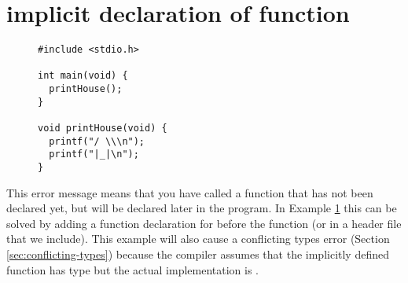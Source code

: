 \section{implicit declaration of function}\label{sec:implicit-def}

\begin{figure}
\begin{lstlisting}
#include <stdio.h>

int main(void) {
  printHouse();
}

void printHouse(void) {
  printf("/ \\\n");
  printf("|_|\n");
}
\end{lstlisting}
\label{ex:missing-dec}
\end{figure}

This error message means that you have called a function that has not been declared yet, but will be declared later in the program.
In Example \ref{ex:missing-dec} this can be solved by adding a function declaration for  before the  function (or in a header file that we include).  This example will also cause a conflicting types error (Section \ref{sec:conflicting-types}) because the compiler assumes that the implicitly defined function has type  but the actual implementation is .

\newpage
